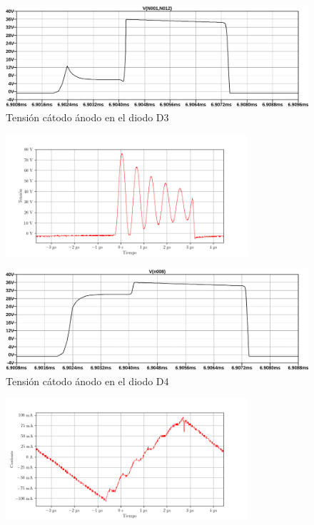 \begin{figure}[H]
    \centering
    \includegraphics[width=\textwidth]{images/sim/25.pdf}
    \caption{Tensión cátodo ánodo en el diodo D3}
    \label{fig:sim:25}
\end{figure}

\begin{figure}[H]
    \centering
    \includegraphics[width=0.8\textwidth]{images/capturas-osciloscopio/17-11-2022/63.png}
    \caption{}
    \label{fig:osc:63}
\end{figure}

\begin{figure}[H]
    \centering
    \includegraphics[width=\textwidth]{images/sim/24.pdf}
    \caption{Tensión cátodo ánodo en el diodo D4}
    \label{fig:sim:24}
\end{figure}


\begin{figure}[H]
    \centering
    \includegraphics[width=0.8\textwidth]{images/capturas-osciloscopio/17-11-2022/66.png}
    \caption{}
    \label{fig:osc:66}
\end{figure}

